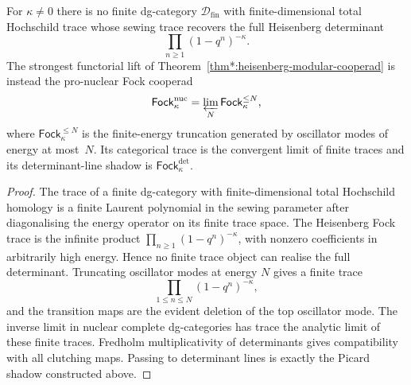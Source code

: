 \documentclass[11pt]{article}
\newcommand{\cD}{\mathcal{D}}
\begin{document}
\begin{theorem}
\label{thm:finite-fock-obstruction-nuclear-replacement}
For $\kappa\neq0$ there is no finite dg-category
$\cD_{\mathrm{fin}}$ with finite-dimensional total Hochschild trace
whose sewing trace recovers the full Heisenberg determinant
\[
  \prod_{n\ge1}(1-q^n)^{-\kappa}.
\]
The strongest functorial lift of
Theorem~\ref{thm*:heisenberg-modular-cooperad} is instead the
pro-nuclear Fock cooperad
\[
  \mathsf{Fock}^{\mathrm{nuc}}_\kappa
  =
  \varprojlim_N
  \mathsf{Fock}^{\leq N}_\kappa,
\]
where $\mathsf{Fock}^{\leq N}_\kappa$ is the finite-energy
truncation generated by oscillator modes of energy at most~$N$.
Its categorical trace is the convergent limit of finite traces and
its determinant-line shadow is
$\mathsf{Fock}^{\det}_\kappa$.
\end{theorem}

\begin{proof}
The trace of a finite dg-category with finite-dimensional total
Hochschild homology is a finite Laurent polynomial in the sewing
parameter after diagonalising the energy operator on its finite
trace space.  The Heisenberg Fock trace is the infinite product
$\prod_{n\ge1}(1-q^n)^{-\kappa}$, with nonzero coefficients in
arbitrarily high energy.  Hence no finite trace object can realise
the full determinant.  Truncating oscillator modes at energy
$N$ gives a finite trace
\[
  \prod_{1\le n\le N}(1-q^n)^{-\kappa},
\]
and the transition maps are the evident deletion of the top
oscillator mode.  The inverse limit in nuclear complete
dg-categories has trace the analytic limit of these finite traces.
Fredholm multiplicativity of determinants gives compatibility with
all clutching maps.  Passing to determinant lines is exactly the
Picard shadow constructed above.
\end{proof}
\end{document}
